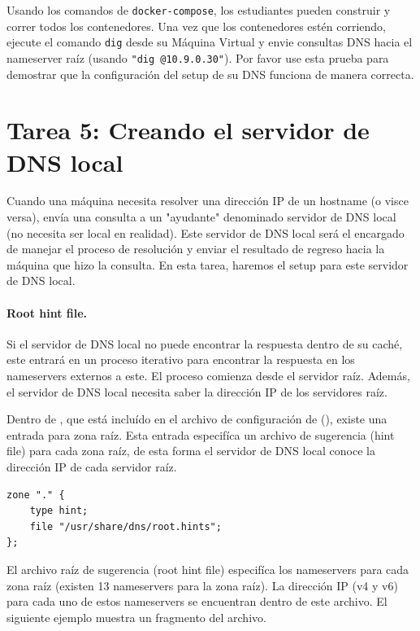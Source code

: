 Usando los comandos de \texttt{docker-compose}, los estudiantes pueden construir y correr todos los contenedores.
Una vez que los contenedores estén corriendo, ejecute el comando \texttt{dig} desde su Máquina Virtual y envie consultas DNS hacia el nameserver raíz (usando \texttt{"dig @10.9.0.30"}). Por favor use esta prueba para demostrar que la configuración del setup de su DNS funciona de manera correcta.


\section{Tarea 5: Creando el servidor de DNS local} 

Cuando una máquina necesita resolver una dirección IP de un hostname (o visce versa), envía una consulta a un "ayudante" denominado servidor de DNS local (no necesita ser local en realidad). Este servidor de DNS local será el encargado de manejar el proceso de resolución y enviar el resultado de regreso hacia la máquina que hizo la consulta.
En esta tarea, haremos el setup para este servidor de DNS local.


\paragraph{Root hint file.}
Si el servidor de DNS local no puede encontrar la respuesta dentro de su caché, este entrará en un proceso iterativo para encontrar la respuesta en los nameservers externos a este. El proceso comienza desde el servidor raíz.
Además, el servidor de DNS local necesita saber la dirección IP de los servidores raíz.

Dentro de , que está incluído en el archivo de configuración de \bind (), existe una entrada para zona raíz. Esta entrada especifíca un archivo de sugerencia (hint file) para cada zona raíz, de esta forma el servidor de DNS local conoce la dirección IP de cada servidor raíz.


\begin{lstlisting}
zone "." {
	type hint;
	file "/usr/share/dns/root.hints";
};
\end{lstlisting}

El archivo raíz de sugerencia (root hint file) especifíca los nameservers para cada zona raíz (existen 13 nameservers para la zona raíz). La dirección IP (v4 y v6) para cada uno de estos nameservers se encuentran dentro de este archivo.
El siguiente ejemplo muestra un fragmento del archivo.

